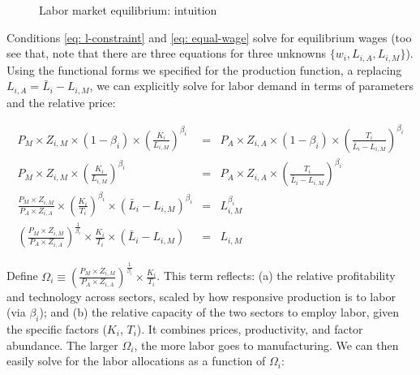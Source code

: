 \documentclass[11pt,letterpaper]{article}
\begin{document}
\begin{figure}
        \caption{Labor market equilibrium: intuition}
    \label{fig: mpl}
\end{figure}

Conditions \ref{eq: l-constraint} and \ref{eq: equal-wage} solve for equilibrium wages (too see that, note that there are three equations for three unknowns $\{w_i, L_{i,A}, L_{i,M}\}$). Using the functional forms we specified for the production function, a replacing $L_{i,A} = \bar{L}_i - L_{i,M}$, we can explicitly solve for labor demand in terms of parameters and the relative price:

{ \scriptsize
\begin{eqnarray*}
    P_{M} \times  Z_{i,M} \times (1-\beta_i) \times \left( \frac{K_{i}}{L_{i,M}} \right)^{\beta_i} &=& P_{A} \times  Z_{i,A} \times (1-\beta_i) \times \left( \frac{T_{i}}{\bar{L}_i - L_{i,M}} \right)^{\beta_i} \\
    P_{M} \times  Z_{i,M} \times \left( \frac{K_{i}}{L_{i,M}} \right)^{\beta_i} &=& P_{A} \times  Z_{i,A}  \times \left( \frac{T_{i}}{\bar{L}_i - L_{i,M}} \right)^{\beta_i} \\
    \frac{P_{M} \times  Z_{i,M}}{P_{A} \times  Z_{i,A}} \times \left( \frac{K_{i}}{T_{i}} \right)^{\beta_i} \times (\bar{L}_i - L_{i,M})^{\beta_i} &=&  L_{i,M}^{\beta_i} \\
     \left( \frac{P_{M} \times  Z_{i,M}}{P_{A} \times  Z_{i,A}} \right)^{\frac{1}{\beta_i}} \times  \frac{K_{i}}{T_{i}} \times (\bar{L}_i - L_{i,M}) &=&  L_{i,M}
\end{eqnarray*}
}

Define $\Omega_i \equiv \left( \frac{P_{M} \times  Z_{i,M}}{P_{A} \times  Z_{i,A}} \right)^{\frac{1}{\beta_i}} \times  \frac{K_{i}}{T_{i}}$. This term reflects: (a) the relative profitability and technology across sectors, scaled by how responsive production is to labor (via $\beta_i$); and (b) the relative capacity of the two sectors to employ labor, given the specific factors ($K_i$, $T_i$). It combines prices, productivity, and factor abundance. The larger $\Omega_i$, the more labor goes to manufacturing. We can then easily solve for the labor allocations as a function of $\Omega_i$:
\end{document}
